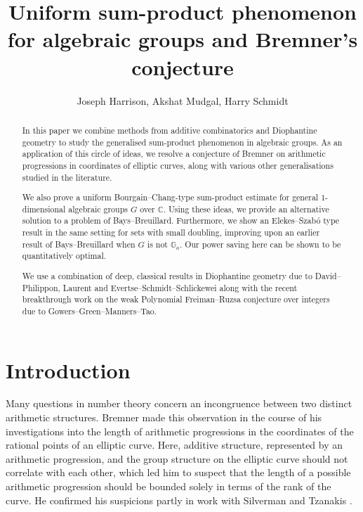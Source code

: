 \documentclass[12pt, reqno]{amsart}
\title[Sum-product phenomenon for algebraic groups and Bremner's conjecture]{Uniform sum-product phenomenon for algebraic groups and Bremner's conjecture}
\author{Joseph Harrison, Akshat Mudgal, Harry Schmidt}
\theoremstyle{remark}
\theoremstyle{definition}
\numberwithin{equation}{section}
\begin{document}
 \maketitle

 


\begin{abstract} 
In this paper we combine methods from additive combinatorics and Diophantine geometry to study the generalised sum-product phenomenon in algebraic groups. As an application of this circle of ideas, we resolve  a conjecture of Bremner on arithmetic progressions in coordinates of elliptic curves, along with various other generalisations studied in the literature. 

We also prove a uniform Bourgain--Chang-type sum-product estimate for general $1$-dimensional algebraic groups $G$ over $\mathbb{C}$. Using these ideas, we provide an alternative solution to a problem of Bays--Breuillard. Furthermore, we show an Elekes--Szab\'{o} type result in the same setting for sets with small doubling, improving upon an earlier result of Bays--Breuillard when $G$ is not $\mathbb{G}_a$. Our power saving here can be shown to be quantitatively optimal.

We use a combination of deep, classical results in Diophantine geometry due to David--Philippon, Laurent and Evertse--Schmidt--Schlickewei along with the recent breakthrough work on the weak Polynomial Freiman--Ruzsa conjecture over integers due to Gowers--Green--Manners--Tao.


\end{abstract}


\section{Introduction} \label{introduction}
 

 Many questions in number theory concern an incongruence between two distinct arithmetic structures.  Bremner \cite{Bremner} made this observation in the course of his investigations into the length of arithmetic progressions in the coordinates of the rational points of an elliptic curve.  Here, additive structure, represented by an arithmetic progression, and the group structure on the elliptic curve should not correlate with each other, which led him to suspect that the length of a possible arithmetic progression should be bounded solely in terms of the rank of the curve. He confirmed his suspicions partly in work  with Silverman and Tzanakis \cite{BremnerSilverman}. 
 
\end{document}
